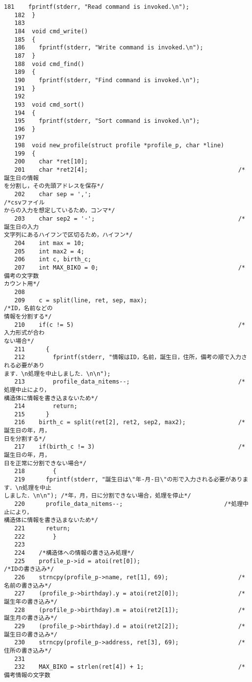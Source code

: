 \begin{Verbatim}[fontsize=\small, baselinestretch=0.8]
   181	  fprintf(stderr, "Read command is invoked.\n");
   182	}
   183	
   184	void cmd_write()
   185	{
   186	  fprintf(stderr, "Write command is invoked.\n");
   187	}
   188	void cmd_find()
   189	{
   190	  fprintf(stderr, "Find command is invoked.\n");
   191	}
   192	
   193	void cmd_sort()
   194	{
   195	  fprintf(stderr, "Sort command is invoked.\n");
   196	}
   197	
   198	void new_profile(struct profile *profile_p, char *line)
   199	{
   200	  char *ret[10];
   201	  char *ret2[4];                                           /*誕生日の情報
を分割し，その先頭アドレスを保存*/
   202	  char sep = ',';                                          /*csvファイル
からの入力を想定しているため，コンマ*/
   203	  char sep2 = '-';                                         /*誕生日の入力
文字列にあるハイフンで区切るため，ハイフン*/
   204	  int max = 10;
   205	  int max2 = 4;
   206	  int c, birth_c;
   207	  int MAX_BIKO = 0;                                        /*備考の文字数
カウント用*/
   208	  
   209	  c = split(line, ret, sep, max);                          /*ID，名前などの
情報を分割する*/
   210	  if(c != 5)                                               /*入力形式が合わ
ない場合*/
   211	    {
   212	      fprintf(stderr, "情報はID，名前，誕生日，住所，備考の順で入力される必要があり
ます．\n処理を中止しました．\n\n");
   213	      profile_data_nitems--;                               /*処理中止により，
構造体に情報を書き込まないため*/
   214	      return;
   215	    }
   216	  birth_c = split(ret[2], ret2, sep2, max2);               /*誕生日の年，月，
日を分割する*/
   217	  if(birth_c != 3)                                         /*誕生日の年，月，
日を正常に分割できない場合*/
   218	      {
   219		fprintf(stderr, "誕生日は\"年-月-日\"の形で入力される必要があります．\n処理を中止
しました．\n\n"); /*年，月，日に分割できない場合，処理を停止*/
   220		profile_data_nitems--;                             /*処理中止により，
構造体に情報を書き込まないため*/
   221		return;
   222	      }
   223	
   224	  /*構造体への情報の書き込み処理*/
   225	  profile_p->id = atoi(ret[0]);                            /*IDの書き込み*/
   226	  strncpy(profile_p->name, ret[1], 69);                    /*名前の書き込み*/
   227	  (profile_p->birthday).y = atoi(ret2[0]);                 /*誕生年の書き込み*/
   228	  (profile_p->birthday).m = atoi(ret2[1]);                 /*誕生月の書き込み*/
   229	  (profile_p->birthday).d = atoi(ret2[2]);                 /*誕生日の書き込み*/
   230	  strncpy(profile_p->address, ret[3], 69);                 /*住所の書き込み*/
   231	
   232	  MAX_BIKO = strlen(ret[4]) + 1;                           /*備考情報の文字数

\end{Verbatim}

